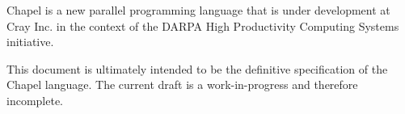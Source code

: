 \label{Scope}

Chapel is a new parallel programming language that is under
development at Cray Inc. in the context of the DARPA High Productivity
Computing Systems initiative.

This document is ultimately intended to be the definitive
specification of the Chapel language.  The current draft is a
work-in-progress and therefore incomplete.


